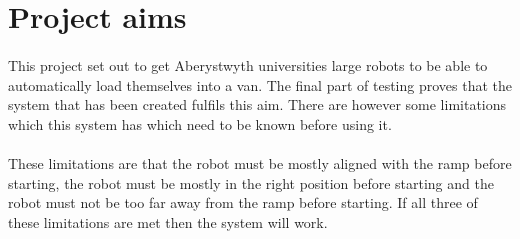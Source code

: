 \section{Project aims}
\paragraph{}
This project set out to get Aberystwyth universities large robots to be able to automatically load themselves into a van. The final part of testing proves that the system that has been created fulfils this aim. There are however some limitations which this system has which need to be known before using it.

\paragraph{}
These limitations are that the robot must be mostly aligned with the ramp before starting, the robot must be mostly in the right position before starting and the robot must not be too far away from the ramp before starting. If all three of these limitations are met then the system will work.


